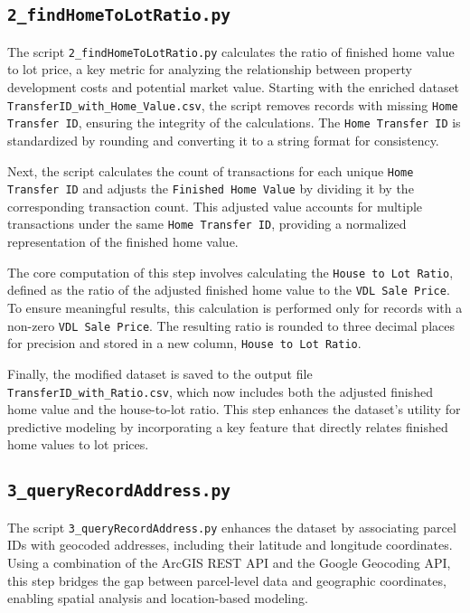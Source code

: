 \subsection{\texttt{2\_findHomeToLotRatio.py}}

The script \texttt{2\_findHomeToLotRatio.py} calculates the ratio of finished home value to lot price, a key metric for analyzing the relationship between property development costs and potential market value. Starting with the enriched dataset \texttt{TransferID\_with\_Home\_Value.csv}, the script removes records with missing \texttt{Home Transfer ID}, ensuring the integrity of the calculations. The \texttt{Home Transfer ID} is standardized by rounding and converting it to a string format for consistency.

Next, the script calculates the count of transactions for each unique \texttt{Home Transfer ID} and adjusts the \texttt{Finished Home Value} by dividing it by the corresponding transaction count. This adjusted value accounts for multiple transactions under the same \texttt{Home Transfer ID}, providing a normalized representation of the finished home value.

The core computation of this step involves calculating the \texttt{House to Lot Ratio}, defined as the ratio of the adjusted finished home value to the \texttt{VDL Sale Price}. To ensure meaningful results, this calculation is performed only for records with a non-zero \texttt{VDL Sale Price}. The resulting ratio is rounded to three decimal places for precision and stored in a new column, \texttt{House to Lot Ratio}.

Finally, the modified dataset is saved to the output file \texttt{TransferID\_with\_Ratio.csv}, which now includes both the adjusted finished home value and the house-to-lot ratio. This step enhances the dataset’s utility for predictive modeling by incorporating a key feature that directly relates finished home values to lot prices.

\subsection{\texttt{3\_queryRecordAddress.py}}

The script \texttt{3\_queryRecordAddress.py} enhances the dataset by associating parcel IDs with geocoded addresses, including their latitude and longitude coordinates. Using a combination of the ArcGIS REST API and the Google Geocoding API, this step bridges the gap between parcel-level data and geographic coordinates, enabling spatial analysis and location-based modeling.

